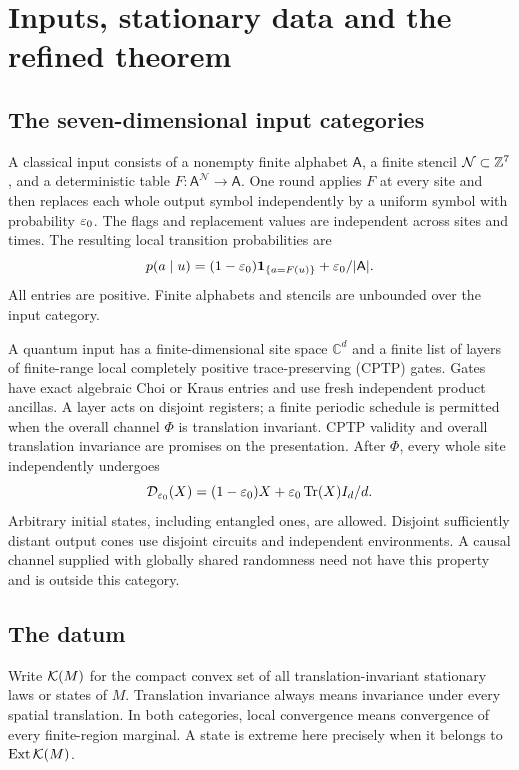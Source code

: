 \section{Inputs, stationary data and the refined theorem}\label{sec:framework}
\subsection{The seven-dimensional input categories}
A classical input consists of a nonempty finite alphabet $\mathsf A$, a finite stencil $\mathcal N\subset\mathbb Z^7$, and a deterministic table $F:\mathsf A^{\mathcal N}\to\mathsf A$. One round applies $F$ at every site and then replaces each whole output symbol independently by a uniform symbol with probability $\varepsilon_0$. The flags and replacement values are independent across sites and times. The resulting local transition probabilities are
\[
 p(a\mid u)=(1-\varepsilon_0)\mathbf 1_{\{a=F(u)\}}+\varepsilon_0/|\mathsf A|.
\]
All entries are positive. Finite alphabets and stencils are unbounded over the input category.

A quantum input has a finite-dimensional site space $\mathbb C^d$ and a finite list of layers of finite-range local completely positive trace-preserving (CPTP) gates. Gates have exact algebraic Choi or Kraus entries and use fresh independent product ancillas. A layer acts on disjoint registers; a finite periodic schedule is permitted when the overall channel $\Phi$ is translation invariant. CPTP validity and overall translation invariance are promises on the presentation. After $\Phi$, every whole site independently undergoes
\[
 \mathcal D_{\varepsilon_0}(X)=(1-\varepsilon_0)X+\varepsilon_0\operatorname{Tr}(X)I_d/d.
\]
Arbitrary initial states, including entangled ones, are allowed. Disjoint sufficiently distant output cones use disjoint circuits and independent environments. A causal channel supplied with globally shared randomness need not have this property and is outside this category.

\subsection{The datum}
Write $\mathcal K(M)$ for the compact convex set of all translation-invariant stationary laws or states of $M$. Translation invariance always means invariance under every spatial translation. In both categories, local convergence means convergence of every finite-region marginal. A state is extreme here precisely when it belongs to $\operatorname{Ext}\mathcal K(M)$.

